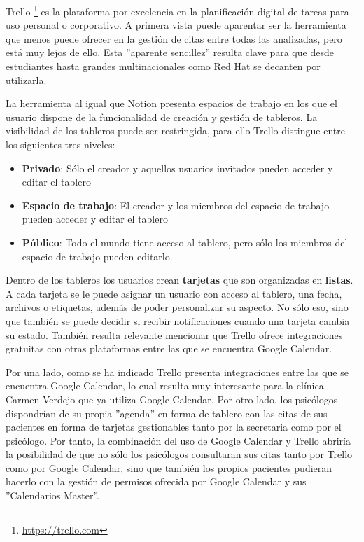 Trello \footnote{\url{https://trello.com}} es la plataforma por excelencia en la planificación digital de tareas para uso personal o corporativo.  A primera vista puede aparentar ser la herramienta que menos puede ofrecer en la gestión de citas entre todas las analizadas, pero está muy lejos de ello. Esta ''aparente sencillez'' resulta clave para que desde estudiantes hasta grandes multinacionales como Red Hat se decanten por utilizarla. \bigskip

La herramienta al igual que Notion presenta espacios de trabajo en los que el usuario dispone de la funcionalidad de creación y gestión de tableros. La visibilidad de los tableros puede ser restringida, para ello Trello distingue entre los siguientes tres niveles:

\begin{itemize}
    \item \textbf{Privado}: Sólo el creador y aquellos usuarios invitados pueden acceder y editar el tablero 
    \item \textbf{Espacio de trabajo}: El creador y los miembros del espacio de trabajo pueden acceder y editar el tablero
    \item \textbf{Público}: Todo el mundo tiene acceso al tablero, pero sólo los miembros del espacio de trabajo pueden editarlo.
\end{itemize}

Dentro de los tableros los usuarios crean \textbf{tarjetas} que son organizadas en \textbf{listas}. A cada tarjeta se le puede asignar un usuario con acceso al tablero, una fecha, archivos o etiquetas, además de poder personalizar su aspecto. No sólo eso, sino que también se puede decidir si recibir notificaciones cuando una tarjeta cambia su estado. También resulta relevante mencionar que Trello ofrece integraciones gratuitas con otras plataformas entre las que se encuentra Google Calendar. \bigskip

Por una lado, como se ha indicado Trello presenta integraciones entre las que se encuentra Google Calendar, lo cual resulta muy interesante para la clínica Carmen Verdejo que ya utiliza Google Calendar. Por otro lado, los psicólogos dispondrían de su propia ''agenda'' en forma de tablero con las citas de sus pacientes en forma de tarjetas gestionables tanto por la secretaria como por el psicólogo. Por tanto, la combinación del uso de Google Calendar y Trello abriría la posibilidad de que no sólo los psicólogos consultaran sus citas tanto por Trello como por Google Calendar, sino que también los propios pacientes pudieran hacerlo con la gestión de permisos ofrecida por Google Calendar y sus ''Calendarios Master''. \bigskip

